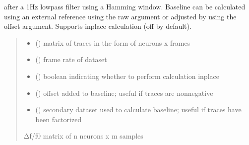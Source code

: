\documentclass[letterpaper,10pt,english]{sphinxmanual}
\begin{document}
\begin{fulllineitems}
after a 1Hz low\sphinxhyphen{}pass filter using a Hamming window. Baseline can be calculated using an external reference using the
raw argument or adjusted by using the offset argument. Supports in\sphinxhyphen{}place calculation (off by default).
\begin{quote}\begin{description}
\begin{itemize}
\item {} 
\sphinxAtStartPar
{} () \textendash{} matrix of traces in the form of neurons x frames

\item {} 
\sphinxAtStartPar
{} () \textendash{} frame rate of dataset

\item {} 
\sphinxAtStartPar
{} () \textendash{} boolean indicating whether to perform calculation in\sphinxhyphen{}place

\item {} 
\sphinxAtStartPar
{} () \textendash{} offset added to baseline; useful if traces are non\sphinxhyphen{}negative

\item {} 
\sphinxAtStartPar
{} () \textendash{} secondary dataset used to calculate baseline; useful if traces have been factorized

\end{itemize}

\sphinxAtStartPar
Δf/f0 matrix of n neurons x m samples

\sphinxAtStartPar
{}

\end{description}\end{quote}

\end{fulllineitems}
\end{document}

